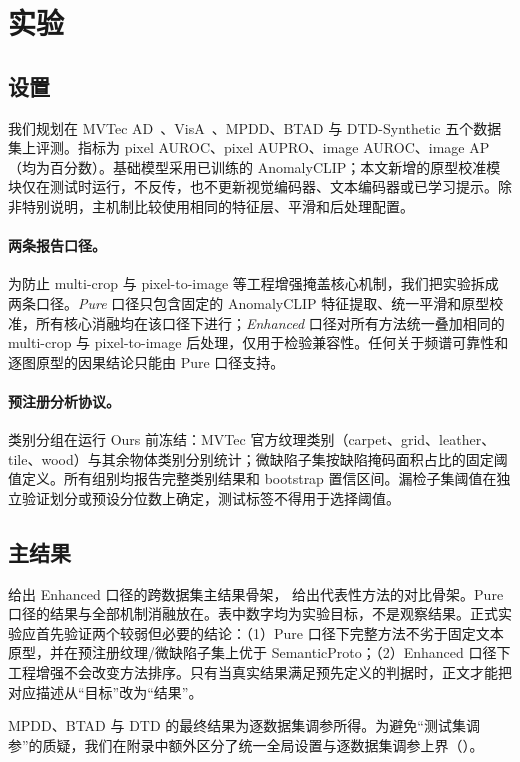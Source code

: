 \section{实验}
\label{sec:experiments}

\subsection{设置}
我们规划在 MVTec AD~\cite{bergmann2019mvtec}、VisA~\cite{zou2022visa}、MPDD、BTAD 与 DTD-Synthetic 五个数据集上评测。指标为 pixel AUROC、pixel AUPRO、image AUROC、image AP（均为百分数）。基础模型采用已训练的 AnomalyCLIP；本文新增的原型校准模块仅在测试时运行，不反传，也不更新视觉编码器、文本编码器或已学习提示。除非特别说明，主机制比较使用相同的特征层、平滑和后处理配置。

\paragraph{两条报告口径。}
为防止 multi-crop 与 pixel-to-image 等工程增强掩盖核心机制，我们把实验拆成两条口径。\emph{Pure} 口径只包含固定的 AnomalyCLIP 特征提取、统一平滑和原型校准，所有核心消融均在该口径下进行；\emph{Enhanced} 口径对所有方法统一叠加相同的 multi-crop 与 pixel-to-image 后处理，仅用于检验兼容性。任何关于频谱可靠性和逐图原型的因果结论只能由 Pure 口径支持。

\paragraph{预注册分析协议。}
类别分组在运行 Ours 前冻结：MVTec 官方纹理类别（carpet、grid、leather、tile、wood）与其余物体类别分别统计；微缺陷子集按缺陷掩码面积占比的固定阈值定义。所有组别均报告完整类别结果和 bootstrap 置信区间。漏检子集阈值在独立验证划分或预设分位数上确定，测试标签不得用于选择阈值。

\subsection{主结果}
 给出 Enhanced 口径的跨数据集主结果骨架， 给出代表性方法的对比骨架。Pure 口径的结果与全部机制消融放在。表中数字均为实验目标，不是观察结果。正式实验应首先验证两个较弱但必要的结论：（1）Pure 口径下完整方法不劣于固定文本原型，并在预注册纹理/微缺陷子集上优于 SemanticProto；（2）Enhanced 口径下工程增强不会改变方法排序。只有当真实结果满足预先定义的判据时，正文才能把对应描述从“目标”改为“结果”。

MPDD、BTAD 与 DTD 的最终结果为逐数据集调参所得。为避免“测试集调参”的质疑，我们在附录中额外区分了统一全局设置与逐数据集调参上界（）。

